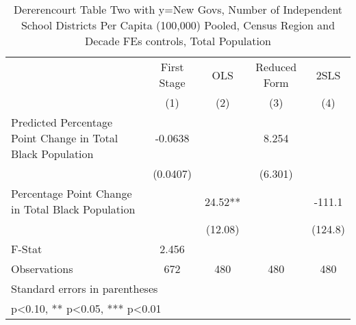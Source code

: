 \begin{table}[htbp]\centering
\def\sym#1{\ifmmode^{#1}\else\(^{#1}\)\fi}
\caption{Dererencourt Table Two with y=New Govs, Number of Independent School Districts Per Capita (100,000) Pooled, Census Region and Decade FEs controls, Total Population}
\begin{tabular}{l*{4}{c}}
\toprule
                    & First Stage   &         OLS   &Reduced Form   &        2SLS   \\
                    &\multicolumn{1}{c}{(1)}   &\multicolumn{1}{c}{(2)}   &\multicolumn{1}{c}{(3)}   &\multicolumn{1}{c}{(4)}   \\
\midrule
Predicted Percentage Point Change in Total Black Population&     -0.0638   &               &       8.254   &               \\
                    &    (0.0407)   &               &     (6.301)   &               \\
\addlinespace
Percentage Point Change in Total Black Population&               &       24.52** &               &      -111.1   \\
                    &               &     (12.08)   &               &     (124.8)   \\
\midrule
F-Stat              &       2.456   &               &               &               \\
Observations        &         672   &         480   &         480   &         480   \\
\bottomrule
\multicolumn{5}{l}{\footnotesize Standard errors in parentheses}\\
\multicolumn{5}{l}{\footnotesize * p<0.10, ** p<0.05, *** p<0.01}\\
\end{tabular}
\end{table}
